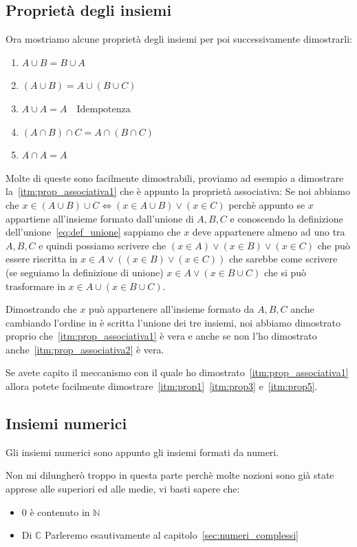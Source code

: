 \documentclass{article}
\theoremstyle{definition}
\begin{document}
\subsection{Proprietà degli insiemi}
Ora mostriamo alcune proprietà degli insiemi per poi successivamente dimostrarli:
\begin{enumerate}
        \item $A \cup B = B \cup A$\label{itm:prop1}	
        \item $(A \cup B) = A \cup (B \cup C)$\label{itm:prop_associativa1}
        \item $A \cup A = A \quad \mbox{Idempotenza}$\label{itm:prop3}
        \item $(A \cap B) \cap C = A \cap (B \cap C)$\label{itm:prop_associativa2} 
        \item $A \cap A = A$\label{itm:prop5}
\end{enumerate}
Molte di queste sono facilmente dimostrabili, proviamo ad esempio a dimostrare la~\ref{itm:prop_associativa1} che è appunto la proprietà associativa: \newline
Se noi abbiamo che $x \in (A \cup B) \cup C \Leftrightarrow (x \in A \cup B) \lor (x \in C)$ perchè appunto se $x$ appartiene all'insieme formato dall'unione di $A,B,C$ e conoscendo la definizione dell'unione~\ref{eq:def_unione}  sappiamo che $x$ deve appartenere almeno ad uno tra $A,B,C$ e quindi possiamo scrivere che $(x \in A) \lor (x \in B) \lor (x \in C)$ che può essere riscritta in $x \in A \lor ((x \in B) \lor (x \in C))$ che sarebbe come scrivere (se seguiamo la definizione di unione) $x \in A \lor (x \in B \cup C)$ che si può trasformare in $x \in A \cup (x \in B \cup C)$. \par
Dimostrando che $x$ può appartenere all'insieme formato da $A,B,C$ anche cambiando l'ordine in è scritta l'unione dei tre insiemi, noi abbiamo dimostrato proprio che~\ref{itm:prop_associativa1} è vera e anche se non l'ho dimostrato anche~\ref{itm:prop_associativa2} è vera.\par
Se avete capito il meccanismo con il quale ho dimostrato~\ref{itm:prop_associativa1} allora potete facilmente dimostrare~\ref{itm:prop1}~\ref{itm:prop3} e~\ref{itm:prop5}.



\subsection{Insiemi numerici}
Gli insiemi numerici sono appunto gli insiemi formati da numeri. \par
Non mi dilungherò troppo in questa parte perchè molte nozioni sono già state apprese alle superiori ed alle medie, vi basti sapere che:
\begin{itemize}
        \item $0$ è contenuto in $\mathbb{N}$
        \item Di $\mathbb{C}$ Parleremo esautivamente al capitolo~\ref{sec:numeri_complessi} 
\end{itemize}
\end{document}
